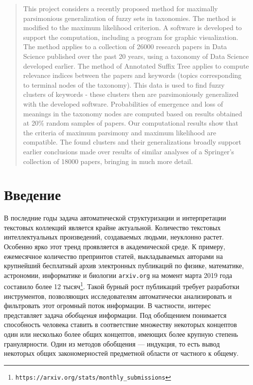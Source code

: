 \documentclass[12pt]{article}
\let\oldsection\section
\renewcommand{\section}{\clearpage\oldsection}
\begin{document}
\begin{abstract}
	This project considers a recently proposed method for maximally parsimonious generalization of fuzzy sets in taxonomies. The method is modified to the maximum likelihood criterion. A software is developed to support the computation, including a program for graphic visualization. The method applies to a collection of 26000 research papers in Data Science published over the past 20 years, using a taxonomy of Data Science developed earlier.   The method of Annotated Suffix Tree applies to compute relevance indices between the papers and keywords (topics corresponding to terminal nodes of the taxonomy). This data is used to find fuzzy clusters of keywords - these clusters then are parsimoniously generalized with the developed software. Probabilities of emergence and loss of meanings in the taxonomy nodes are computed based on results obtained at 20\% random samples of papers. Our computational results show that the criteria of maximum parsimony and maximum likelihood are compatible. The found clusters and their generalizations broadly support earlier conclusions made over results of similar analyses of a Springer's collection of 18000 papers, bringing in much more detail.
\end{abstract}
\newpage

\setcounter{page}{1}
\tableofcontents
\newpage

\section{Введение}

В последние годы задача автоматической структуризации и интерпретации текстовых коллекций является крайне актуальной. Количество текстовых интеллектуальных произведений, создаваемых людьми, неуклонно растет. Особенно ярко этот тренд проявляется в академической среде. К примеру, ежемесячное количество препринтов статей, выкладываемых авторами на крупнейший бесплатный архив электронных публикаций по физике, математике, астрономии, информатике и биологии \texttt{arxiv.org} на момент марта 2019 года составило более 12 тысяч\footnote{\texttt{https://arxiv.org/stats/monthly\_submissions}}. Такой бурный рост публикаций требует разработки инструментов, позволяющих исследователям автоматически анализировать и фильтровать этот огромный поток информации. В частности, интерес представляет задача \emph{обобщения} информации. Под обобщением понимается способность человека ставить в соответствие множеству некоторых концептов один или несколько более общих концептов, имеющих более крупную степень гранулярности. Один из методов обобщения --- индукция, то есть вывод некоторых общих закономерностей предметной области от частного к общему.
\end{document}

